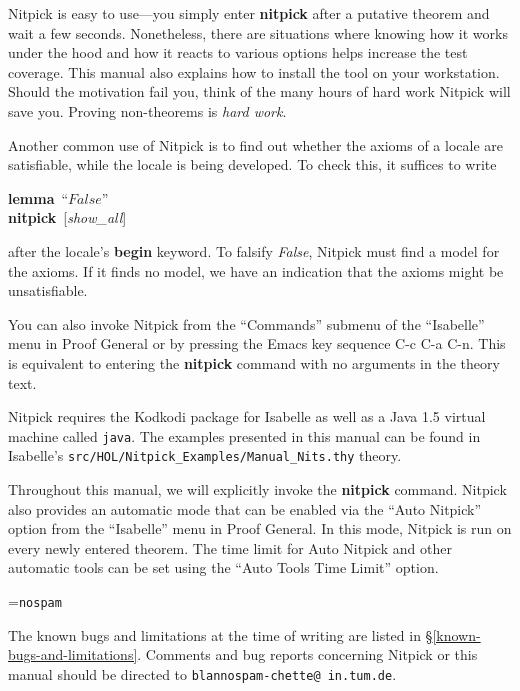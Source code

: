 \documentclass[a4paper,12pt]{article}
\begin{document}
Nitpick is easy to use---you simply enter \textbf{nitpick} after a putative
theorem and wait a few seconds. Nonetheless, there are situations where knowing
how it works under the hood and how it reacts to various options helps
increase the test coverage. This manual also explains how to install the tool on
your workstation. Should the motivation fail you, think of the many hours of
hard work Nitpick will save you. Proving non-theorems is \textsl{hard work}.

Another common use of Nitpick is to find out whether the axioms of a locale are
satisfiable, while the locale is being developed. To check this, it suffices to
write

\prew
\textbf{lemma}~``$\textit{False}$'' \\
\textbf{nitpick}~[\textit{show\_all}]
\postw

after the locale's \textbf{begin} keyword. To falsify \textit{False}, Nitpick
must find a model for the axioms. If it finds no model, we have an indication
that the axioms might be unsatisfiable.

You can also invoke Nitpick from the ``Commands'' submenu of the
``Isabelle'' menu in Proof General or by pressing the Emacs key sequence C-c C-a
C-n. This is equivalent to entering the \textbf{nitpick} command with no
arguments in the theory text.

Nitpick requires the Kodkodi package for Isabelle as well as a Java 1.5 virtual
machine called \texttt{java}. The examples presented in this manual can be found
in Isabelle's \texttt{src/HOL/Nitpick\_Examples/Manual\_Nits.thy} theory.

Throughout this manual, we will explicitly invoke the \textbf{nitpick} command.
Nitpick also provides an automatic mode that can be enabled via the ``Auto
Nitpick'' option from the ``Isabelle'' menu in Proof General. In this mode,
Nitpick is run on every newly entered theorem. The time limit for Auto Nitpick
and other automatic tools can be set using the ``Auto Tools Time Limit'' option.

\newbox\boxA
\setbox\boxA=\hbox{\texttt{nospam}}

The known bugs and limitations at the time of writing are listed in
\S\ref{known-bugs-and-limitations}. Comments and bug reports concerning Nitpick
or this manual should be directed to
\texttt{blan{\color{white}nospam}\kern-\wd\boxA{}chette@\allowbreak
in.\allowbreak tum.\allowbreak de}.

\smallskipamount
\end{document}
